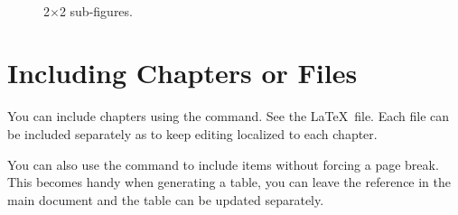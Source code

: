 \documentclass[12pt]{report}
\begin{document}
\begin{figure}[!t]
   \centering
    \quad
   \\
\caption{2$\times$2 sub-figures.}
\label{fig:2x2_subfigs}
\end{figure}

\section{Including Chapters or Files}
You can include chapters using the \verb'' command. See the \LaTeX\ file.  Each file can be included separately as to keep editing localized to each chapter.
%
%

You can also use the \verb'' command to include items without forcing a page break.  This becomes handy when generating a table, you can leave the reference in the main document and the table can be updated separately.

\end{document}
